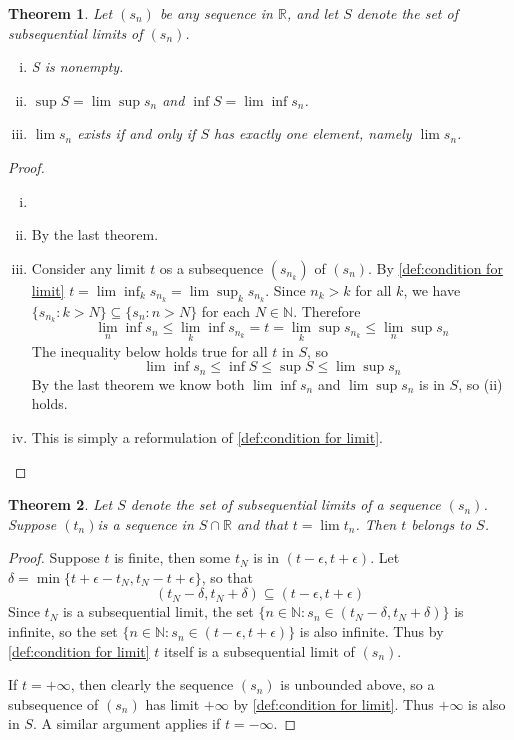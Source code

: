 \documentclass[12pt, lettersize]{book}
\newtheorem{thm}{Theorem}[section]
\begin{document}
		\begin{thm}\label{def:subsequential limit condition}
		Let $(s_n)$ be any sequence in $\mathbb{R}$, and let $S$ denote the set of subsequential limits of $(s_n)$.
		\begin{enumerate}[(i)]
			\item S is nonempty.
			\item $\sup S=\lim\sup s_n$ and $\inf S=\lim\inf s_n$.
			\item $\lim s_n$ exists if and only if $S$ has exactly one element, namely $\lim s_n$.
		\end{enumerate}
		\end{thm}
		\begin{proof}
		\begin{enumerate}[(i)]
			\item[] 
			\item By the last theorem.
			\item Consider any limit $t$ os a subsequence $(s_{n_k})$ of $(s_n)$. By \ref{def:condition for limit} $t=\lim\inf_ks_{n_k}=\lim\sup_ks_{n_k}$. Since $n_k>k$ for all $k$, we have $\{s_{n_k}: k>N\}\subseteq\{s_n: n>N\}$ for each $N\in\mathbb{N}$. Therefore
			\begin{displaymath}
				\lim\limits_{n}\inf s_n\leq\lim\limits_{k}\inf s_{n_k}=t=\lim\limits_{k}\sup s_{n_k}\leq	\lim\limits_{n}\sup s_n
			\end{displaymath}
			The inequality below holds true for all $t$ in $S$, so
			\begin{displaymath}
				\lim\inf s_n\leq\inf S\leq\sup S\leq\lim\sup s_n
			\end{displaymath}
			By the last theorem we know both $\lim\inf s_n$ and $\lim\sup s_n$ is in $S$, so (ii) holds.
			\item This is simply a reformulation of \ref{def:condition for limit}.
		\end{enumerate}
		\end{proof}
		
		\begin{thm}
		Let $S$ denote the set of subsequential limits of a sequence $(s_n)$. Suppose $(t_n)$is a sequence in $S\cap\mathbb{R}$ and that $t=\lim t_n$. Then $t$ belongs to $S$.
		\end{thm}
		\begin{proof}
		Suppose $t$ is finite, then some $t_N$ is in $(t-\epsilon,t+\epsilon)$. Let $\delta=\min\{t+\epsilon-t_N,t_N-t+\epsilon\}$, so that
		\begin{displaymath}
			(t_N-\delta, t_N+\delta)\subseteq(t-\epsilon,t+\epsilon)
		\end{displaymath}
		Since $t_N$ is a subsequential limit, the set $\{n\in\mathbb{N}: s_n\in(t_N-\delta, t_N+\delta)\}$ is infinite,
		so the set $\{n\in\mathbb{N}: s_n\in(t-\epsilon, t+\epsilon)\}$ is also infinite. Thus by \ref{def:condition for limit} $t$ itself is a subsequential limit of $(s_n)$. 
		
		If $t=+\infty$, then clearly the sequence $(s_n)$ is unbounded above, so a subsequence of $(s_n)$ has limit $+\infty$ by \ref{def:condition for limit}. Thus $+\infty$ is also in $S$. A similar argument applies if $t=-\infty$.
		\end{proof}
		\newpage
		
\end{document}
